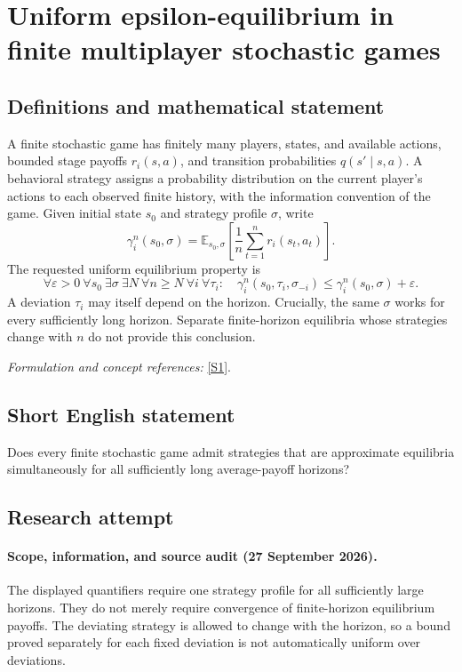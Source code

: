 \documentclass[11pt]{article}
\begin{document}
\section*{\texorpdfstring{Uniform epsilon-equilibrium in finite multiplayer stochastic games}{Uniform epsilon-equilibrium in finite multiplayer stochastic games}}\label{statement}
\subsection{Definitions and mathematical statement}
A finite stochastic game has finitely many players, states, and available actions, bounded stage payoffs $r_i(s,a)$, and transition probabilities $q(s'\mid s,a)$. A behavioral strategy assigns a probability distribution on the current player's actions to each observed finite history, with the information convention of the game. Given initial state $s_0$ and strategy profile $\sigma$, write
\[
 \gamma_i^n(s_0,\sigma)={\mathbb{E}}_{s_0,\sigma}
 \left[\frac1n\sum_{t=1}^n r_i(s_t,a_t)\right].
\]
The requested uniform equilibrium property is
\[
 \forall{\varepsilon}>0\ \forall s_0\ \exists\sigma\ \exists N\
 \forall n\ge N\ \forall i\ \forall\tau_i:\quad
 \gamma_i^n(s_0,\tau_i,\sigma_{-i})
 \le\gamma_i^n(s_0,\sigma)+{\varepsilon}.
\]
A deviation $\tau_i$ may itself depend on the horizon. Crucially, the same $\sigma$ works for every sufficiently long horizon. Separate finite-horizon equilibria whose strategies change with $n$ do not provide this conclusion.
\par\smallskip\textit{Formulation and concept references:} \href{https://mathconjectures.com/conjectures/GAME-001}{[S1]}.

\subsection{Short English statement}
Does every finite stochastic game admit strategies that are approximate equilibria simultaneously for all sufficiently long average-payoff horizons?
\subsection{Research attempt}
\paragraph{Scope, information, and source audit (27 September 2026).}
The displayed quantifiers require one strategy profile for all sufficiently
large horizons. They do not merely require convergence of finite-horizon
equilibrium payoffs. The deviating strategy is allowed to change with the
horizon, so a bound proved separately for each fixed deviation is not
automatically uniform over deviations.
\end{document}
